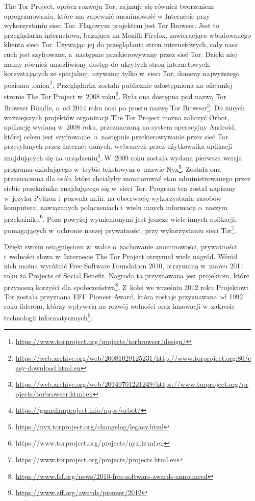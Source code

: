 The Tor Project, oprócz rozwoju Tor, zajmuje się również tworzeniem oprogramowania, które ma zapewnić anonimowość w Internecie przy wykorzystaniu sieci Tor. Flagowym projektem jest Tor Browser. Jest to przeglądarka internetowa, bazująca na Mozilli Firefox, zawieracjąca wbudowanego klienta sieci Tor. Używając jej do przeglądania stron internetowych, cały nasz ruch jest szyfrowany, a~następnie przekierowywany przez sieć Tor. Dzięki niej mamy również umożliwiony dostęp do ukrytych stron internetowych, korzystających ze specjalnej, używanej tylko w~sieci Tor, domeny najwyższego poziomu .onion\footnote{\url{https://www.torproject.org/projects/torbrowser/design/}}. Przeglądarka została publicznie udostępniona na oficjanlej stronie The Tor Project w~2008 roku\footnote{\url{https://web.archive.org/web/20081029125231/http://www.torproject.org:80/easy-download.html.en}}. Była ona dostępna pod nazwą Tor Browser Bundle, a~od 2014 roku nosi po prostu nazwę Tor Browser\footnote{\url{https://web.archive.org/web/20140701221249/https://www.torproject.org/projects/torbrowser.html.en}}. Do innych ważniejszych projektów organizacji The Tor Project można zaliczyć Orbot, aplikację wydaną w~2008 roku, przeznaczoną na system operacyjny Android, której celem jest szyfrowanie, a~następnie przekierowywanie przez sieć Tor przesyłanych przez Internet danych, wybranych przez użytkownika aplikacji znajdujących się na urządzeniu\footnote{\url{https://guardianproject.info/apps/orbot/}}. W~2009 roku została wydana pierwsza wersja programu działającego w~trybie tekstowym o~nazwie Nyx\footnote{\url{https://nyx.torproject.org/changelog/legacy.html}}. Została ona przeznaczona dla osób, które chciałyby monitorować stan administrowanego przez siebie przekaźnika znajdującego się w~sieci Tor. Program ten został napisany w~języku Python i~pozwala m.in. na obserwację wykorzystania zasobów komputera, nawiązanych połączeniach i~wielu innych informacji o~naszym przekaźniku\footnote{https://www.torproject.org/projects/nyx.html.en}. Poza powyżej wymienionymi jest jeszcze wiele innych aplikacji, pomagających w~ochronie naszej prywatności, przy wykorzystaniu sieci Tor\footnote{https://www.torproject.org/projects/projects.html.en}.

Dzięki swoim osiągnięciom w~walce o~zachowanie anonimowości, prywatności i~wolności słowa w~Internecie The Tor Project otrzymał wiele nagród. Wśród nich można wyróżnić Free Software Foundation 2010, otrzymaną w~marcu 2011 roku za Projects of Social Benefit. Nagroda ta przyznawana jest projektom, które przynoszą korzyści dla społeczeństwa\footnote{\url{https://www.fsf.org/news/2010-free-software-awards-announced}}. Z~kolei we wrześniu 2012 roku Projektowi Tor została przyznana EFF Pioneer Award, która zostaje przyznawana od 1992 roku liderom, którzy wpływają na rozwój wolności oraz innowacji w~zakresie technologii informatycznych\footnote{\url{https://www.eff.org/awards/pioneer/2012}}.